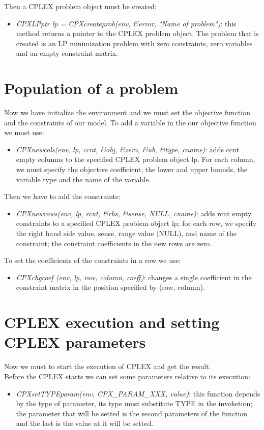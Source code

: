 \begin{appendices}
Then a \textsc{CPLEX} problem object must be created:
\begin{itemize}
\item \textit{CPXLPptr lp = CPXcreateprob(env, \&error, "Name of problem")}: this method returns a pointer to the \textsc{CPLEX} problem object. The problem that is created is an LP minimization problem with zero constraints, zero variables and an empty constraint matrix.
\end{itemize}

\section{Population of a problem}
Now we have initialize the environment and we must set the objective function and the constraints of our model.
To add a variable in the our objective function we must use:
\begin{itemize}
\item \textit{CPXnewcols(env, lp, ccnt, \&obj, \&zero, \&ub, \&type, cname)}: adds ccnt empty columns to the specified \textsc{CPLEX} problem object lp. For each column, we must specify the objective coefficient, the lower and upper bounds, the variable type and the name of the variable.
\end{itemize}

Then we have to add the constraints:
\begin{itemize}
\item \textit{CPXnewrows(env, lp, rcnt, \&rhs, \&sense, NULL, cname)}: adds rcnt empty constraints to a specified \textsc{CPLEX} problem object lp; for each row, we specify the right hand side value, sense, range value (NULL), and name of the constraint; the constraint coefficients in the new rows are zero.
\end{itemize}

To set the coefficients of the constraints in a row we use:
\begin{itemize}
\item \textit{CPXchgcoef (env, lp, row, column, coeff)}: changes a single coefficient in the constraint matrix in the position specified by (row, column).
\end{itemize}

\section{\textsc{CPLEX} execution and setting \textsc{CPLEX} parameters}
Now we must to start the execution of \textsc{CPLEX} and get the result.\\
Before the \textsc{CPLEX} starts we can set some parameters relative to its execution:
\begin{itemize}
\item \textit{CPXsetTYPEparam(env, CPX\_PARAM\_XXX, value)}: this function depends by the type of parameter, its type must substitute TYPE in the invoketion; the parameter that will be setted  is the second parameters of the function and the last is the value at it will be setted.
\end{itemize}


\end{appendices}
